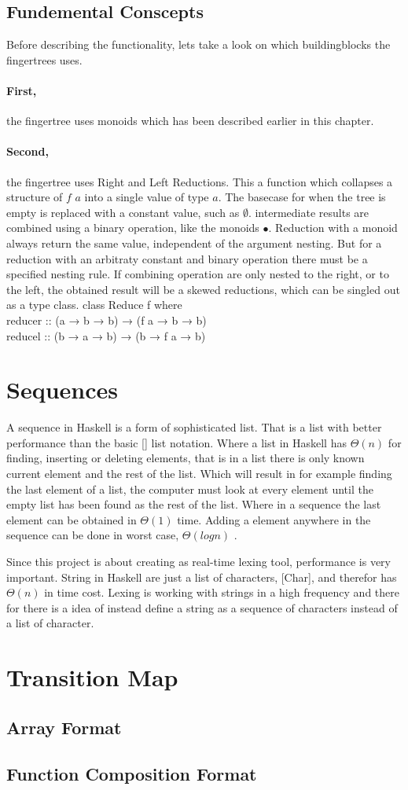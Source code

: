 \subsection{Fundemental Conscepts}
Before describing the functionality, lets take a look on which buildingblocks the fingertrees uses.
\paragraph{First,}
the fingertree uses monoids which has been described earlier in this chapter.
\paragraph{Second,} 
the fingertree uses Right and Left Reductions. This a function which collapses a structure of $f$ $a$ into
a single value of type $a$. The basecase for when the tree is empty is replaced with a constant value, such as
$\emptyset$. intermediate results are combined using a binary operation, like the monoids $\bullet$.
Reduction with a monoid always return the same value, independent of the argument nesting. But for a reduction with 
an arbitraty constant and binary operation there must be a specified nesting rule. 
If combining operation are only nested to the right, or to the
left, the obtained result will be a skewed reductions, which can be singled out as a type class.
class Reduce f where\\
reducer :: (a → b → b) → (f a → b → b)\\
reducel :: (b → a → b) → (b → f a → b)\\
\cite{fingertree}

\section{Sequences}
A sequence in Haskell is a form of sophisticated list. That is a list with better performance than the basic [] list notation. Where a list in Haskell has $\Theta(n)$ for finding, inserting or deleting elements, that is in a list there is only known current element and the rest of the list. Which will result in for example finding the last element of a list, the computer must look at every element until the empty list has been found as the rest of the list. Where in a sequence the last element can be obtained in $\Theta(1)$ time. Adding a element anywhere in the sequence can be done in worst case, $\Theta(log n)$ \cite{fingertree}. 

Since this project is about creating as real-time lexing tool, performance is very important. String in Haskell are just a list of characters, [Char], and therefor has $\Theta(n)$ in time cost. Lexing is working with strings in a high frequency and there for there is a idea of instead define a string as a sequence of characters instead of a list of character. 

\section{Transition Map}
\subsection{Array Format}
\subsection{Function Composition Format}
